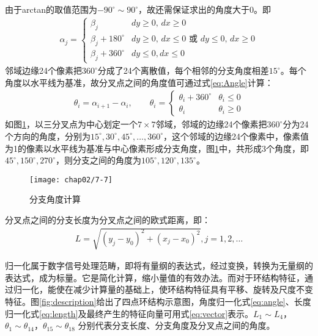 由于arctan的取值范围为$-90^{\circ} \sim 90^{\circ}$，故还需保证求出的角度大于0。即
\begin{align}
\alpha_j = \left\{ \begin{array}{ll}
\beta_j & \textrm{$dy \geq 0$, $dx \geq 0$} \\
\beta_j + 180^{\circ} & \textrm{$dy \geq 0$, $dx \leq 0$ 或 $dy \leq 0$, $dx \geq 0$}\\
\beta_j + 360^{\circ} & \textrm{$dy \leq 0, dx \leq 0$}
\end{array} \right.
\end{align}
邻域边缘24个像素把$360^{\circ}$分成了24个离散值，每个相邻的分支角度相差$15^{\circ}$。每个角度以水平线为基准，故分叉点之间的角度值可通过式\ref{eq:Angle}计算：
\begin{align}
\theta_i = \alpha_{i+1} - \alpha_i, \qquad
\theta_i = \left\{ \begin{array}{ll}
\theta_i + 360^{\circ} & \theta_i \le 0 \\
\theta_i & \theta_i \geq 0
\end{array} \right.
\label{eq:Angle}
\end{align}
如图\ref{fig:calculate-angles}，以三分叉点为中心划定一个$7\times7$邻域，邻域的边缘24个像素把$360^{\circ}$分为24个方向的角度，分别为$15^{\circ}, 30^{\circ},45^{\circ}, \ldots, 360^{\circ}$，这个邻域的边缘24个像素中，像素值为1的像素以水平线为基准与中心像素形成分支角度，图\ref{fig:calculate-angles}中，共形成3个角度，即$45^{\circ}, 150^{\circ},270^{\circ}$，则分支之间的角度为$105^{\circ}, 120^{\circ}, 135^{\circ}$。

\begin{figure}[H]
\centering
\texttt{[image: chap02/7-7]}
\caption{分支角度计算}
\label{fig:calculate-angles}
\end{figure}

分叉点之间的分支长度为分叉点之间的欧式距离，即：
\begin{align}
L = \sqrt{(y_j - y_0)^2 + (x_j - x_0)^2}, j = 1, 2, \ldots
\end{align}

归一化属于数字信号处理范畴，即将有量纲的表达式，经过变换，转换为无量纲的表达式，成为标量。它是简化计算，缩小量值的有效办法。而对于环结构特征，通过归一化，能使在减少计算量的基础上，使环结构特征具有平移、旋转及尺度不变特征。图\ref{fig:description}给出了四点环结构示意图，角度归一化式\ref{eq:angle}、长度归一化式\ref{eq:length}及最终产生的特征向量可用式\ref{eq:vector}表示。$L_{1} \sim L_{4}$，$\theta_{1} \sim \theta_{14}$，$\theta_{15} \sim \theta_{18}$ 分别代表分支长度、分支角度及分叉点之间的角度。

